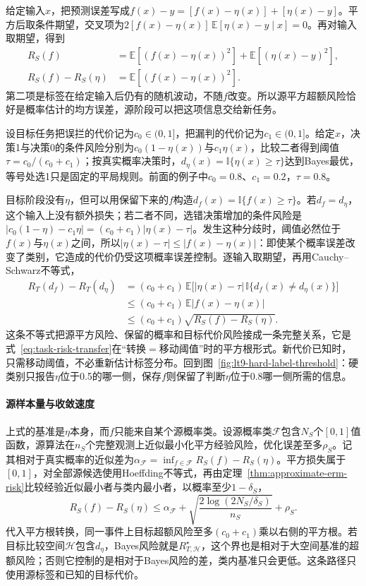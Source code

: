 给定输入$x$，把预测误差写成$f(x)-y=[f(x)-\eta(x)]+[\eta(x)-y]$。平方后取条件期望，交叉项为$2[f(x)-\eta(x)]\,\mathbb E[\eta(x)-y\mid x]=0$。再对输入取期望，得到
\[
 \begin{aligned}
 R_S(f)&=\mathbb E[(f(x)-\eta(x))^2]+\mathbb E[(\eta(x)-y)^2],\\
 R_S(f)-R_S(\eta)&=\mathbb E[(f(x)-\eta(x))^2].
 \end{aligned}
\]
第二项是标签在给定输入后仍有的随机波动，不随$f$改变。所以源平方超额风险恰好是概率估计的均方误差，源阶段可以把这项信息交给新任务。

设目标任务把误拦的代价记为$c_0\in(0,1]$，把漏判的代价记为$c_1\in(0,1]$。给定$x$，决策1与决策0的条件风险分别为$c_0(1-\eta(x))$与$c_1\eta(x)$，比较二者得到阈值$\tau=c_0/(c_0+c_1)$；按真实概率决策时，$d_\eta(x)=\mathbb I\{\eta(x)\geq\tau\}$达到Bayes最优，等号处选1只是固定的平局规则。前面的例子中$c_0=0.8$、$c_1=0.2$，$\tau=0.8$。

目标阶段没有$\eta$，但可以用保留下来的$f$构造$d_f(x)=\mathbb I\{f(x)\geq\tau\}$。若$d_f=d_\eta$，这个输入上没有额外损失；若二者不同，选错决策增加的条件风险是$|c_0(1-\eta)-c_1\eta|=(c_0+c_1)|\eta(x)-\tau|$。发生这种分歧时，阈值必然位于$f(x)$与$\eta(x)$之间，所以$|\eta(x)-\tau|\leq|f(x)-\eta(x)|$：即使某个概率误差改变了类别，它造成的代价仍受这项概率误差控制。逐输入取期望，再用Cauchy--Schwarz不等式，
\begin{align*}
 R_T(d_f)-R_T(d_\eta)
 &= (c_0+c_1)\,\mathbb E\bigl[|\eta(x)-\tau|\,
       \mathbb I\{d_f(x)\neq d_\eta(x)\}\bigr] \\
 &\leq(c_0+c_1)\,\mathbb E|f(x)-\eta(x)| \\
 &\leq(c_0+c_1)\sqrt{R_S(f)-R_S(\eta)} .
\end{align*}
这条不等式把源平方风险、保留的概率和目标代价风险接成一条完整关系，它是式~\eqref{eq:task-risk-transfer}在“转换$=$移动阈值”时的平方根形式。新代价已知时，只需移动阈值，不必重新估计标签分布。回到图~\ref{fig:lt9-hard-label-threshold}：硬类别只报告$\eta$位于0.5的哪一侧，保存$f$则保留了判断$\eta$位于0.8哪一侧所需的信息。

\paragraph{源样本量与收敛速度}
上式的基准是$\eta$本身，而$f$只能来自某个源概率类。设源概率类$\mathcal F$包含$N_S$个$[0,1]$值函数，源算法在$n_S$个完整观测上近似最小化平方经验风险，优化误差至多$\rho_S$。记其相对于真实概率的近似差为$\alpha_{\mathcal F}=\inf_{f\in\mathcal F}R_S(f)-R_S(\eta)$。平方损失属于$[0,1]$，对全部源候选使用Hoeffding不等式，再由定理~\ref{thm:approximate-erm-risk}比较经验近似最小者与类内最小者，以概率至少$1-\delta_S$，
\[
 R_S(f)-R_S(\eta)
 \leq\alpha_{\mathcal F}
     +\sqrt{\frac{2\log(2N_S/\delta_S)}{n_S}}+\rho_S .
\]
代入平方根转换，同一事件上目标超额风险至多$(c_0+c_1)$乘以右侧的平方根。若目标比较空间$\mathcal H$包含$d_\eta$，Bayes风险就是$R_{T,\mathcal H}^{\star}$，这个界也是相对于大空间基准的超额风险；否则它控制的是相对于Bayes风险的差，类内基准只会更低。这条路径只使用源标签和已知的目标代价。

